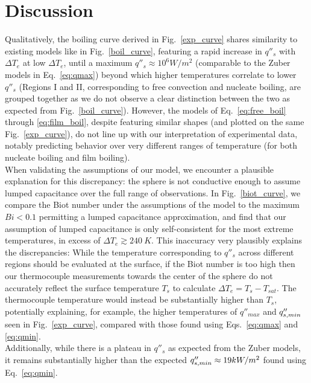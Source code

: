 \documentclass[12pt]{article}
\newcommand{\Te}{\Delta T_e}
\newcommand{\figref}[1]{Fig.~\ref{#1}}
\begin{document}
\section{Discussion}\label{sec:disc}
Qualitatively, the boiling curve derived in \figref{exp_curve} shares similarity to existing models like in \figref{boil_curve}, featuring a rapid increase in $q''_s$ with $\Te$ at low $\Te$, until a maximum $q''_s\approx10^6 W/m^2$ (comparable to the Zuber models in Eq.~\ref{eq:qmax}) beyond which higher temperatures correlate to lower $q''_s$ (Regions I and II, corresponding to free convection and nucleate boiling, are grouped together as we do not observe a clear distinction between the two as expected from \figref{boil_curve}).
However, the models of Eq.~\ref{eq:free_boil} through \ref{eq:film_boil}, despite featuring similar shapes (and plotted on the same \figref{exp_curve}), do not line up with our interpretation of experimental data, notably predicting behavior over very different ranges of temperature (for both nucleate boiling and film boiling).\\

When validating the assumptions of our model, we encounter a plausible explanation for this discrepancy: the sphere is not conductive enough to assume lumped capacitance over the full range of observations.
In \figref{biot_curve}, we compare the Biot number under the assumptions of the model to the maximum $Bi<0.1$ permitting a lumped capacitance approximation, and find that our assumption of lumped capacitance is only self-consistent for the most extreme temperatures, in excess of $\Te\gtrsim 240~K$.
This inaccuracy very plausibly explains the discrepancies: While the temperature corresponding to $q''_s$ across different regions should be evaluated at the surface, if the Biot number is too high then our thermocouple measurements towards the center of the sphere do not accurately reflect the surface temperature $T_s$ to calculate $\Te=T_s-T_{sat}$.
The thermocouple temperature would instead be substantially higher than $T_s$, potentially explaining, for example, the higher temperatures of $q''_{max}$ and $q''_{s,min}$ seen in \figref{exp_curve}, compared with those found using Eqs.~\ref{eq:qmax} and \ref{eq:qmin}.\\

Additionally, while there is a plateau in $q''_s$ as expected from the Zuber models, it remains substantially higher than the expected $q''_{s,min}\approx 19kW/m^2$ found using Eq.~\ref{eq:qmin}.\\
\end{document}
